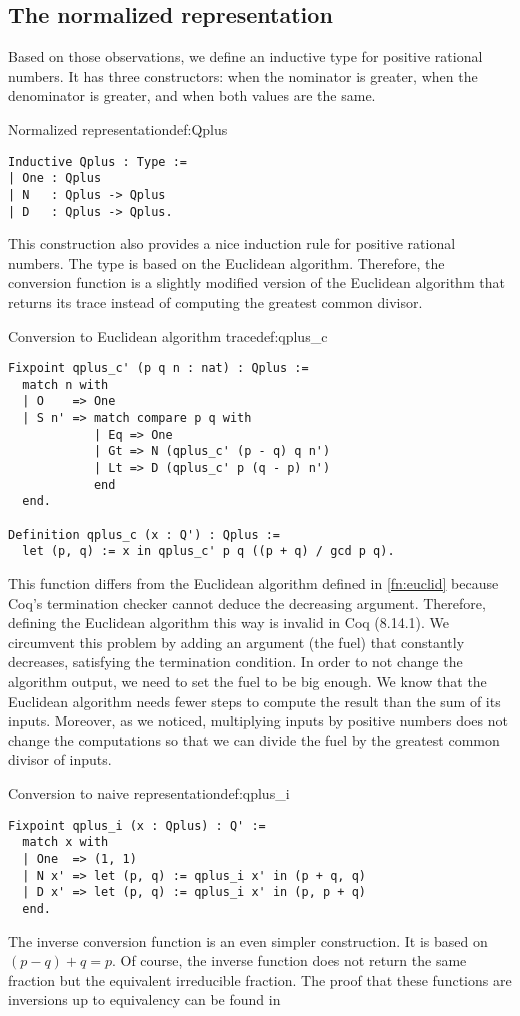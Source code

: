 \subsection{The normalized representation}
Based on those observations, we define an inductive type for positive rational numbers. It has three constructors:  when the nominator is greater,  when the denominator is greater, and  when both values are the same.
\begin{defi}{Normalized representation}{def:Qplus}
\begin{verbatim}
Inductive Qplus : Type :=
| One : Qplus
| N   : Qplus -> Qplus
| D   : Qplus -> Qplus.
\end{verbatim}
\end{defi}
This construction also provides a nice induction rule for positive rational numbers. The type  is based on the Euclidean algorithm. Therefore, the conversion function is a slightly modified version of the Euclidean algorithm that returns its trace instead of computing the greatest common divisor. 
\begin{func}{Conversion to Euclidean algorithm trace}{def:qplus_c}
\begin{verbatim}
Fixpoint qplus_c' (p q n : nat) : Qplus :=
  match n with
  | O    => One
  | S n' => match compare p q with
            | Eq => One
            | Gt => N (qplus_c' (p - q) q n')
            | Lt => D (qplus_c' p (q - p) n')
            end
  end.

Definition qplus_c (x : Q') : Qplus :=
  let (p, q) := x in qplus_c' p q ((p + q) / gcd p q).
\end{verbatim}
\end{func}
This function differs from the Euclidean algorithm defined in \ref{fn:euclid} because Coq's termination checker cannot deduce the decreasing argument. Therefore, defining the Euclidean algorithm this way is invalid in Coq (8.14.1). We circumvent this problem by adding an argument (the fuel) that constantly decreases, satisfying the termination condition. In order to not change the algorithm output, we need to set the fuel to be big enough. We know that the Euclidean algorithm needs fewer steps to compute the result than the sum of its inputs. Moreover, as we noticed, multiplying inputs by positive numbers does not change the computations so that we can divide the fuel by the greatest common divisor of inputs.
\begin{func}{Conversion to naive representation}{def:qplus_i}
\begin{verbatim}
Fixpoint qplus_i (x : Qplus) : Q' :=
  match x with
  | One  => (1, 1)
  | N x' => let (p, q) := qplus_i x' in (p + q, q)
  | D x' => let (p, q) := qplus_i x' in (p, p + q)
  end.
\end{verbatim}
\end{func}
The inverse conversion function is an even simpler construction. It is based on $(p - q) + q = p$. Of course, the inverse function does not return the same fraction but the equivalent irreducible fraction. The proof that these functions are inversions up to equivalency can be found in 
